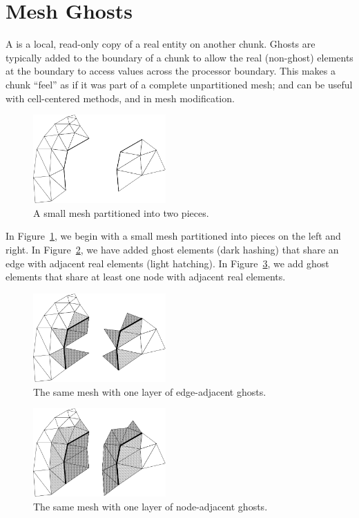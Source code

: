 \section{Mesh Ghosts}
\label{sec:ghost}

A  is a local, read-only copy of a real entity
on another chunk. Ghosts are typically added to the boundary of a chunk to allow the real (non-ghost) elements at the boundary to access values across the processor boundary.  This makes a chunk ``feel'' as if it was part of a complete unpartitioned mesh; and can be useful with cell-centered methods, and in mesh modification.


\begin{figure}[h]
\begin{center}
\includegraphics[width=2in]{fig/ghost_pre}
\end{center}
\caption{A small mesh partitioned into two pieces.}
\label{fig:ghostpre}
\end{figure}

In Figure~\ref{fig:ghostpre}, we begin with a small mesh partitioned
into pieces on the left and right.  In Figure~\ref{fig:ghostedge},
we have added ghost elements (dark hashing) that share an edge with
adjacent real elements (light hatching).  In Figure~\ref{fig:ghostnode},
we add ghost elements that share at least one node with adjacent 
real elements.

\begin{figure}[h]
\begin{center}
\includegraphics[width=2in]{fig/ghost_edge}
\end{center}
\caption{The same mesh with one layer of edge-adjacent ghosts.}
\label{fig:ghostedge}
\end{figure}

\begin{figure}[h]
\begin{center}
\includegraphics[width=2in]{fig/ghost_node}
\end{center}
\caption{The same mesh with one layer of node-adjacent ghosts.}
\label{fig:ghostnode}
\end{figure}


